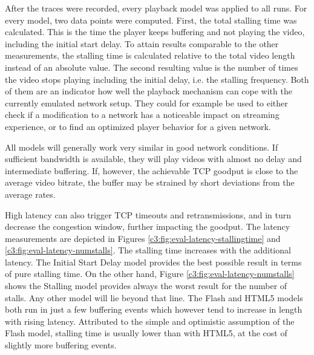 After the traces were recorded, every playback model was applied to all runs. For every model, two data points were computed. First, the total stalling time was calculated. This is the time the player keeps buffering and not playing the video, including the initial start delay. To attain results comparable to the other measurements, the stalling time is calculated relative to the total video length instead of an absolute value. The second resulting value is the number of times the video stops playing including the initial delay, i.e. the stalling frequency. Both of them are an indicator how well the playback mechanism can cope with the currently emulated network setup. They could for example be used to either check if a modification to a network has a noticeable impact on streaming experience, or to find an optimized player behavior for a given network.

All models will generally work very similar in good network conditions. If sufficient bandwidth is available, they will play videos with almost no delay and  intermediate buffering. If, however, the achievable TCP goodput is close to the average video bitrate, the buffer may be strained by short deviations from the average rates. %

High latency can also trigger TCP timeouts and retransmissions, and in turn decrease the congestion window, further impacting the goodput. The latency measurements are depicted in Figures \ref{c3:fig:eval-latency-stallingtime} and \ref{c3:fig:eval-latency-numstalls}. The stalling time increases with the additional latency. The Initial Start Delay model provides the best possible result in terms of pure stalling time. On the other hand, Figure \ref{c3:fig:eval-latency-numstalls} shows the Stalling model provides always the worst result for the number of stalls. Any other model will lie beyond that line. The Flash and HTML5 models both run in just a few buffering events which however tend to increase in length with rising latency. Attributed to the simple and optimistic assumption of the Flash model, stalling time is usually lower than with HTML5, at the cost of slightly more buffering events.
 

